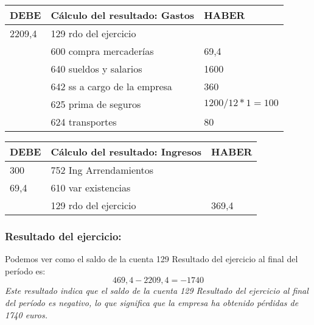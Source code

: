 \documentclass[a4paper,12pt]{article}
\begin{document}
        \begin{table}[H]
            \centering
            \begin{tabular}{|p{3cm}|p{6cm}|p{3cm}|}
            \hline
            \textbf{DEBE} & \textbf{Cálculo del resultado: Gastos} & \textbf{HABER} \\
            \hline
            2209,4 & 129 rdo del ejercicio & \\
            \hline
            & 600 compra mercaderías & 69,4\\
            \hline
            & 640 sueldos y salarios & 1600 \\
            \hline
            & 642 ss a cargo de la empresa & 360\\
            \hline
            & 625 prima de seguros& $1200/12  * 1 = 100$\\
            \hline
            & 624 transportes & 80 \\
            \hline
            \end{tabular}
            \end{table}

            \begin{table}[H]
                \centering
                \begin{tabular}{|p{3cm}|p{6cm}|p{3cm}|}
                \hline
                \textbf{DEBE} & \textbf{Cálculo del resultado: Ingresos} & \textbf{HABER} \\
                \hline
                300 & 752 Ing Arrendamientos & \\
                \hline
                69,4& 610 var existencias& \\
                \hline
                & 129 rdo del ejercicio & 369,4 \\
                \hline
                \end{tabular}
                \end{table}
    
                \subsubsection*{Resultado del ejercicio:}
                Podemos ver como el saldo de la cuenta 129 Resultado del ejercicio al final del período es:
                \begin{equation}
                    469,4 - 2209,4 = -1740
                \end{equation}
                \textit{Este resultado indica que el saldo de la cuenta 129 Resultado del ejercicio al final del período es negativo, lo que significa que la empresa ha obtenido pérdidas de 1740 euros.}
\end{document}
